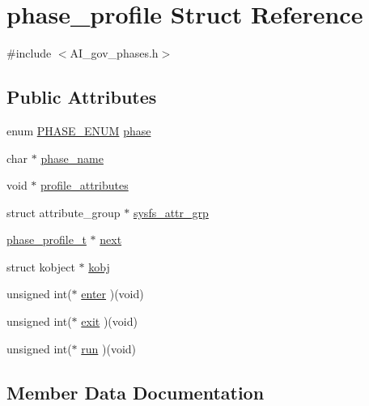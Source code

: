 \hypertarget{structphase__profile}{}\section{phase\+\_\+profile Struct Reference}
\label{structphase__profile}


{\ttfamily \#include $<$A\+I\+\_\+gov\+\_\+phases.\+h$>$}

\subsection*{Public Attributes}
\begin{DoxyCompactItemize}
\item 
enum \hyperlink{AI__gov__phases_8h_a59664fef4d2987410ea13b917756d6ac}{P\+H\+A\+S\+E\+\_\+\+E\+N\+UM} \hyperlink{structphase__profile_a51cbd5f8e428ffd04e5a0feaf2f8caa9}{phase}
\item 
char $\ast$ \hyperlink{structphase__profile_a92a3f2bbc73f54e27255ad67660bcd89}{phase\+\_\+name}
\item 
void $\ast$ \hyperlink{structphase__profile_a0c77f4be0f8286275e0bf6583b1d5c20}{profile\+\_\+attributes}
\item 
struct attribute\+\_\+group $\ast$ \hyperlink{structphase__profile_a75fa703877db612110bead3a231685ee}{sysfs\+\_\+attr\+\_\+grp}
\item 
\hyperlink{AI__gov__phases_8h_a7512cecbb646499da7b0bec7c4155808}{phase\+\_\+profile\+\_\+t} $\ast$ \hyperlink{structphase__profile_a7ba32c8fdbf80efc580c6df57d0ec433}{next}
\item 
struct kobject $\ast$ \hyperlink{structphase__profile_ad75ce163887fd0964c147e23a155e7ab}{kobj}
\item 
unsigned int($\ast$ \hyperlink{structphase__profile_a53beff5bbbc84cbb5c3e5e1dd48593c1}{enter} )(void)
\item 
unsigned int($\ast$ \hyperlink{structphase__profile_a9c942d0c12f12afd5503ddd40498dd5d}{exit} )(void)
\item 
unsigned int($\ast$ \hyperlink{structphase__profile_ae6cf7a65756ec70cd7a50e3367af5eeb}{run} )(void)
\end{DoxyCompactItemize}


\subsection{Member Data Documentation}
\mbox{\label{structphase__profile_a53beff5bbbc84cbb5c3e5e1dd48593c1}} 
